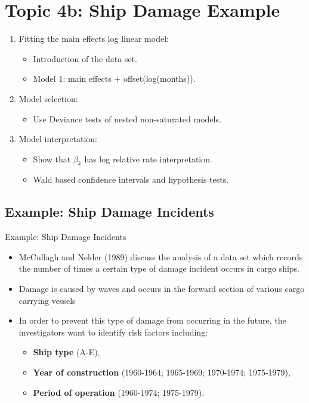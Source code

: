 \documentclass[oneside]{book}\usepackage[]{graphicx}\usepackage[svgnames]{xcolor}
\begin{document}
\section*{Topic 4b: Ship Damage Example}
\begin{enumerate}[1.]
      \item Fitting the main effects log linear model:
            \begin{itemize}
                  \item Introduction of the data set.
                  \item Model 1: main effects + offset(log(months)).
            \end{itemize}
      \item Model selection:
            \begin{itemize}
                  \item Use Deviance tests of nested non-saturated models.
            \end{itemize}
      \item Model interpretation:
            \begin{itemize}
                  \item Show that $ \beta_k $ has log relative rate interpretation.
                  \item Wald based confidence intervals and hypothesis tests.
            \end{itemize}
\end{enumerate}
\subsection*{Example: Ship Damage Incidents}
\begin{Example}{Example: Ship Damage Incidents}
      \begin{itemize}
            \item McCullagh and Nelder (1989) discuss the analysis of a data set which records the
                  number of times a certain type of damage incident occurs in cargo ships.
            \item Damage is caused by waves and occurs in the forward section of various cargo
                  carrying vessels
            \item In order to prevent this type of damage from occurring in the future, the
                  investigators want to identify risk factors including:
                  \begin{itemize}
                        \item \textbf{Ship type} (A-E),
                        \item \textbf{Year of construction} (1960-1964; 1965-1969; 1970-1974; 1975-1979),
                        \item \textbf{Period of operation} (1960-1974; 1975-1979).
                  \end{itemize}
      \end{itemize}
\end{Example}
\end{document}

